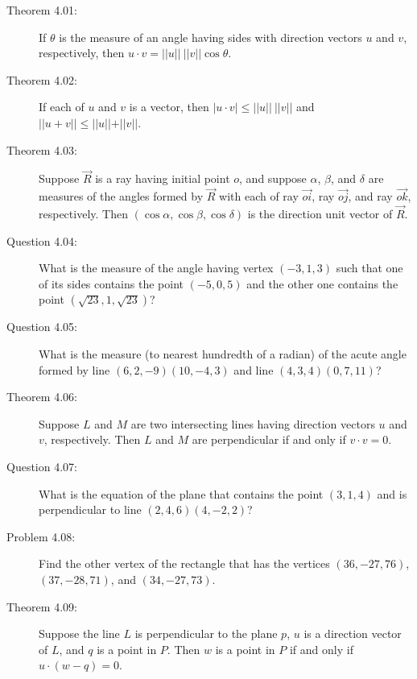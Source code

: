 \documentclass{article}
\begin{document}
\begin{description}

  \item[Theorem 4.01:] If $\theta$ is the measure of an angle having sides with direction vectors $u$ and $v$, respectively, then $u \cdot v = \vert \vert u \vert \vert \  \vert \vert v \vert \vert \cos \theta$.

  \item[Theorem 4.02:] If each of $u$ and $v$ is a vector, then $\vert u \cdot v \vert \leq \vert \vert u \vert \vert \  \vert \vert v \vert \vert$ and $\vert \vert u+v \vert \vert \leq \vert \vert u \vert \vert + \vert \vert v \vert \vert$.

  \item[Theorem 4.03:] Suppose $\overrightarrow{R}$ is a ray having initial point $o$, and suppose $\alpha$, $\beta$, and $\delta$ are measures of the angles formed by $\overrightarrow{R}$ with each of ray $\overrightarrow{oi}$, ray $\overrightarrow{oj}$, and ray $\overrightarrow{ok}$, respectively. Then  $(\cos \alpha, \cos \beta, \cos \delta)$ is the direction unit vector of $\overrightarrow{R}$.

  \item[Question 4.04:] What is the measure of the angle having vertex $(-3, 1, 3)$ such that one of its sides contains the point $(-5, 0, 5)$ and the other one contains the point $(\sqrt{23}, 1, \sqrt{23})$?

  \item[Question 4.05:] What is the measure (to nearest hundredth of a radian) of the acute angle formed by line $(6, 2, -9) (10, -4, 3)$ and line $(4, 3, 4) (0, 7, 11)$?

  \item[Theorem 4.06:] Suppose $L$ and $M$ are two intersecting lines having direction vectors $u$ and $v$, respectively. Then $L$ and $M$ are perpendicular if and only if $v \cdot v = 0$.

  \item[Question 4.07:] What is the equation of the plane that contains the point $(3, 1, 4)$ and is perpendicular to line $(2, 4, 6) (4, -2, 2)$?

  \item[Problem 4.08:] Find the other vertex of the rectangle that has the vertices $(36, -27, 76)$, $(37, -28, 71)$, and $(34, -27, 73)$.

  \item[Theorem 4.09:] Suppose the line $L$ is perpendicular to the plane $p$, $u$ is a direction vector of $L$, and $q$ is a point in $P$. Then $w$ is a point in $P$ if and only if $u \cdot (w-q) = 0$.


\end{description}
\end{document}
